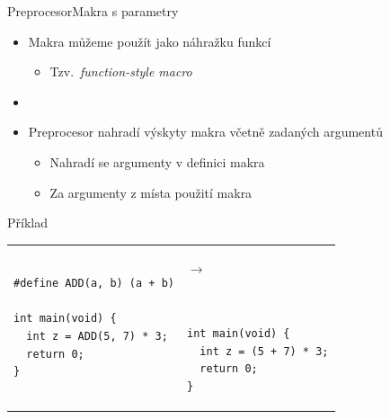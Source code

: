 \begin{frame}[fragile]{Preprocesor}{Makra s parametry}

  \begin{itemize}
    \item Makra můžeme použít jako náhražku funkcí
    \begin{itemize}
      \item Tzv.\ \textit{function-style macro}
    \end{itemize}

    \pause

    \item {} 

    \pause

    \item Preprocesor nahradí výskyty makra včetně zadaných argumentů
    \begin{itemize}
      \item Nahradí se argumenty v definici makra
      \item Za argumenty z místa použití makra
    \end{itemize}

  \end{itemize}

  \pause

\begin{block}{Příklad}
\begin{center}
\begin{tabular}{ll}
\begin{lstlisting}
#define ADD(a, b) (a + b)

int main(void) {
  int z = ADD(5, 7) * 3;
  return 0;
}
\end{lstlisting}
& $\rightarrow$~~~
\begin{lstlisting}


int main(void) {
  int z = (5 + 7) * 3;
  return 0;
}
\end{lstlisting}
\end{tabular}
\end{center}
\end{block}

\end{frame}

%
%

